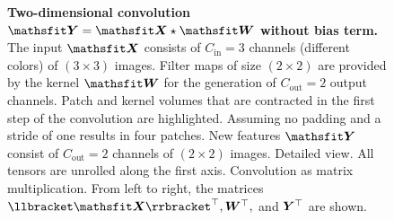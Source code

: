 \tikzset{external/export next=false} %
\begin{figure}
  \centering
  \begin{subfigure}[t]{1.0\linewidth}
    \caption{}
    \label{hbp::subfig:convolutionIllustration1}
    \vspace{-4ex}
  \end{subfigure}

  \vspace{-0.43\textheight}

  \begin{subfigure}[t]{1.0\linewidth}
    \caption{}
    \label{hbp::subfig:convolutionIllustration2}
  \end{subfigure}

  \vspace{0.43\textheight}

  \vspace{-0.17\textheight}

  \begin{subfigure}[t]{1.0\linewidth}
    \caption{}
    \label{hbp::subfig:convolutionIllustration3}
  \end{subfigure}

  \vspace{0.13\textheight}

  \caption{\textbf{Two-dimensional convolution $\tY = \tX \star \tW$ without
      bias term.}  The input
    $\tX$ consists of $C_\text{in} = 3$ channels (different colors) of $(3\times
    3)$ images. Filter maps of size $(2\times 2)$ are provided by the kernel
    $\tW$ for the generation of $C_\text{out} = 2$ output channels. Patch and
    kernel volumes that are contracted in the first step of the convolution are
    highlighted. Assuming no padding and a stride of one results in four
    patches. New features $\tY$ consist of $C_\text{out} = 2$ channels of
    $(2\times 2)$ images. 
    Detailed view. All tensors are unrolled along the first axis.
     Convolution as matrix
    multiplication. From left to right, the matrices $\llbracket
    \tX\rrbracket^\top, \mW^\top,$ and ${\bm{Y}}^\top$ are shown.}
  \label{hbp::fig:convolutionIllustration}
\end{figure}


